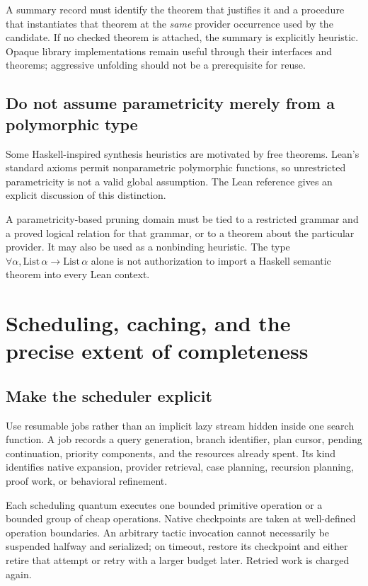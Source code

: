 A summary record must identify the theorem that justifies it and a procedure that instantiates that theorem at the \emph{same} provider occurrence used by the candidate. If no checked theorem is attached, the summary is explicitly heuristic. Opaque library implementations remain useful through their interfaces and theorems; aggressive unfolding should not be a prerequisite for reuse.

\subsection{Do not assume parametricity merely from a polymorphic type}
Some Haskell-inspired synthesis heuristics are motivated by free theorems. Lean's standard axioms permit nonparametric polymorphic functions, so unrestricted parametricity is not a valid global assumption. The Lean reference gives an explicit discussion of this distinction.\cite{axioms}

A parametricity-based pruning domain must be tied to a restricted grammar and a proved logical relation for that grammar, or to a theorem about the particular provider. It may also be used as a nonbinding heuristic. The type $\forall\alpha,\mathrm{List}\,\alpha\to\mathrm{List}\,\alpha$ alone is not authorization to import a Haskell semantic theorem into every Lean context.

\section{Scheduling, caching, and the precise extent of completeness}
\label{sec:scheduling}
\subsection{Make the scheduler explicit}
Use resumable jobs rather than an implicit lazy stream hidden inside one search function. A job records a query generation, branch identifier, plan cursor, pending continuation, priority components, and the resources already spent. Its kind identifies native expansion, provider retrieval, case planning, recursion planning, proof work, or behavioral refinement.

Each scheduling quantum executes one bounded primitive operation or a bounded group of cheap operations. Native checkpoints are taken at well-defined operation boundaries. An arbitrary tactic invocation cannot necessarily be suspended halfway and serialized; on timeout, restore its checkpoint and either retire that attempt or retry with a larger budget later. Retried work is charged again.

